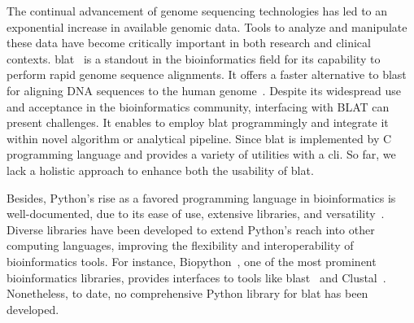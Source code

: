 

The continual advancement of genome sequencing technologies has led to an exponential increase in available genomic data.
Tools to analyze and manipulate these data have become critically important in both research and clinical contexts.
\gls{blat}~\citep{kent2002blat} is a standout in the bioinformatics field for its capability to perform rapid genome sequence alignments.
It offers a faster alternative to \gls{blast}~\citep{altschul1990basic}  for aligning DNA sequences to the human genome~\citep{kent2002blat}.
Despite its widespread use and acceptance in the bioinformatics community, interfacing with BLAT can present challenges.
It enables to employ \gls{blat} programmingly and integrate it within novel algorithm or analytical pipeline.
Since \gls{blat} is implemented by C programming language and provides a variety of utilities with a \gls{cli}.
So far, we lack a holistic approach to enhance both the usability of \gls{blat}.

Besides, Python's rise as a favored programming language in bioinformatics is well-documented, due to its ease of use, extensive libraries, and versatility~\citep{perkel2015programming}.
Diverse libraries have been developed to extend Python's reach into other computing languages, improving the flexibility and interoperability of bioinformatics tools.
For instance, Biopython~\citep{cock2009biopython}, one of the most prominent bioinformatics libraries, provides interfaces to tools like \gls{blast}~\citep{altschul1990basic} and Clustal~\citep{higgins1988clustal}.
Nonetheless, to date, no comprehensive Python library for \gls{blat} has been developed.

